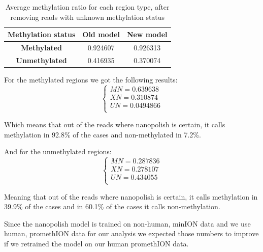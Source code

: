 \begin {table}
    \caption{Average methylation ratio for each region type, after removing reads with unknown methylation status}
    \begin{center}
        \begin{tabular}{c c c } 
            \hline
            \textbf{Methylation status} & \textbf{Old model} & \textbf{New model}\\
             \hline
             \hline
             \textbf{Methylated} & 0.924607 & 0.926313 \\ 
             \textbf{Unmethylated} & 0.416935 & 0.370074 \\ 
             \hline
        \end{tabular}
    \label{table:nanopolish-performance2}
    \end{center}
\end{table}



For the methylated regions we got the following results:
\begin{equation*}
    \begin{cases}
    MN = 0.639638 \\
    XN = 0.310874 \\ 
    UN = 0.0494866 \\ 
    \end{cases}
\end{equation*}

Which means that out of the reads where nanopolish is certain, it calls methylation in 92.8\% of the cases and non-methylated in 7.2\%. 

And for the unmethylated regions:
\begin{equation*}
    \begin{cases}
    MN=0.287836 \\
    XN=0.278107\\
    UN=0.434055\\ 
    \end{cases}
\end{equation*}

Meaning that out of the reads where nanopolish is certain, it calls methylation in 39.9\% of the cases and in 60.1\% of the cases it calls non-methylation.

Since the nanopolish model is trained on non-human, minION data and we use human, promethION data for our analysis we expected those numbers to improve if we retrained the model on our human promethION data. 


